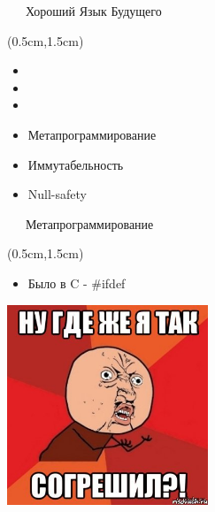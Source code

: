 \documentclass[xetex,18pt,aspectratio=43]{beamer}
\begin{document}
\begin{Large}
\begin{frame}{\ \ \ Хороший Язык Будущего}
\begin{textblock*}{\framewidth-0.8cm}(0.5cm,1.5cm)
\begin{itemize}
  \item {\color{gray}{Строгая типизация (PHP и JS - плохие)}}
  \item {\color{gray}{(Опциональная) статическая типизация}}
  \item {\color{gray}{Package/vendoring manager}}
  \item Метапрограммирование
  \item Иммутабельность
  \item Null-safety
\end{itemize}
\end{textblock*}
\end{frame}

\begin{frame}{\ \ \ Метапрограммирование}
\begin{textblock*}{\framewidth}(0.5cm,1.5cm)
\begin{itemize}
  \item Было в C - \#ifdef
\end{itemize}
\begin{minipage}{\textwidth}
  \centering
  \includegraphics[height=6.0cm]{img/pain}
\end{minipage}
\end{textblock*}
\end{frame}


\end{Large}
\end{document}
